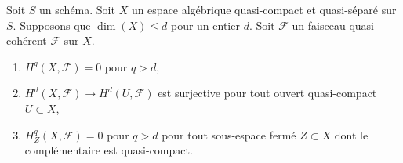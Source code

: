 \begin{lemma}
\label{lemma-vanishing-above-dimension}
Soit $S$ un schéma. Soit $X$ un espace algébrique quasi-compact et quasi-séparé
sur $S$. Supposons que $\dim(X) \leq d$ pour un entier $d$.
Soit $\mathcal{F}$ un faisceau quasi-cohérent $\mathcal{F}$ sur $X$.
\begin{enumerate}
\item $H^q(X, \mathcal{F}) = 0$ pour $q > d$,
\item $H^d(X, \mathcal{F}) \to H^d(U, \mathcal{F})$ est surjective
pour tout ouvert quasi-compact $U \subset X$,
\item $H^q_Z(X, \mathcal{F}) = 0$ pour $q > d$ pour tout sous-espace fermé
$Z \subset X$ dont le complémentaire est quasi-compact.
\end{enumerate}
\end{lemma}

